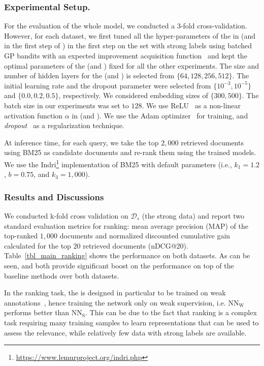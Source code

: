 \subsubsection{Experimental Setup.}
For the evaluation of the whole model, we conducted a 3-fold cross-validation. However, for each dataset, we first tuned all the hyper-parameters of the \tnet in \cws (and \std in the first step of \fwl) in the first step on the set with strong labels using batched GP bandits with an expected improvement acquisition function~\citep{Desautels:2014} and kept the optimal parameters of the \tnet (and \std) fixed for all the other experiments.
The size and number of hidden layers for the \tnet (and \std) is selected from $\{64, 128, 256, 512\}$. The initial learning rate and the dropout parameter were selected from $\{10^{-3}, 10^{-5}\}$ and $\{0.0, 0.2, 0.5\}$, respectively. We considered embedding sizes of $\{300, 500\}$. The batch size in our experiments was set to $128$.  We use ReLU~\citep{Nair:2010} as a non-linear activation function $\alpha$ in \tnet (and \std).  We use the Adam optimizer~\citep{Kingma:2014} for training, and \emph{dropout}~\citep{Srivastava:2014} as a regularization technique.

%
At inference time, for each query, we take the top $2,000$ retrieved documents using BM25 as candidate documents and re-rank them using the trained models. We use the Indri\footnote{\url{https://www.lemurproject.org/indri.php}} implementation of BM25 with default parameters (i.e., $k_1 = 1.2$, $b = 0.75$, and $k_3 = 1,000$).

\subsubsection{Results and Discussions} 
\label{sec:res_and_disc_ranking}
We conducted k-fold cross validation on $\mathcal{D}_s$ (the strong data) and report two standard evaluation metrics for ranking: mean average precision (MAP) of the top-ranked $1,000$
documents and normalized discounted cumulative gain calculated for the top $20$ retrieved documents (nDCG@20). 
Table~\ref{tbl_main_ranking} shows the performance on both datasets. As can be seen, \fwl and \cws both provide significant boost on the performance on top of the baseline methods over both datasets.




In the ranking task, the \std is designed in particular to be trained on weak annotations~\citep{Dehghani:2017:SIGIR}, hence training the network only on weak supervision, i.e. $\text{NN}_{\text{W}}$ performs better than $\text{NN}_{\text{S}}$. This can be due to the fact that ranking is a complex task requiring many training samples to learn representations that can be used to assess the relevance, while relatively few data with strong labels are available.

